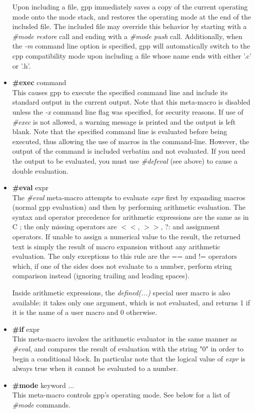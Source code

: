 \begin{itemize}
Upon including a file, gpp immediately saves a copy of the current operating
mode onto the mode stack, and restores the operating mode at the end of the
included file. The included file may override this behavior by starting with
a {\it \#mode restore} call and ending with a {\it \#mode push} call.
Additionally, when the {\it -m} command line option is specified, gpp will
automatically switch to the cpp compatibility mode upon including a file
whose name ends with either '.c' or '.h'.
\item
{\bf \#exec } command\\
This causes gpp to execute the specified command line and include
its standard output in the current output. Note that this meta-macro is
disabled unless the {\it -x} command line flag was specified, for security
reasons. If use of {\it \#exec} is not allowed, a warning message is printed
and the output is left blank. Note that the specified command line is
evaluated before being executed, thus allowing the use of macros in the
command-line. However, the output of the command is included verbatim and 
not evaluated. If you need the output to be evaluated, you must use 
{\it \#defeval} (see above) to cause a double evaluation.
\item
{\bf \#eval } expr\\
The {\it \#eval} meta-macro attempts to evaluate {\it expr} first by expanding
macros (normal gpp evaluation) and then by performing arithmetic evaluation.
The syntax and operator precedence for arithmetic expressions are the same
as in C ; the only missing operators are $<$$<$, $>$$>$, ?: and assignment
operators. If unable to assign a numerical value to the result, the returned
text is simply the result of macro expansion without any arithmetic
evaluation. The only exceptions to this rule are the == and != operators
which, if one of the sides does not evaluate to a number, perform string
comparison instead (ignoring trailing and leading spaces).


Inside arithmetic expressions, the {\it defined(...)} special user macro
is also available: it takes only one argument, which is not evaluated, and
returns 1 if it is the name of a user macro and 0 otherwise.
\item
{\bf \#if } expr\\
This meta-macro invokes the arithmetic evaluator in the same manner as
{\it \#eval}, and compares the result of evaluation with the string "0" in
order to begin a conditional block. In particular note that the logical
value of {\it expr} is always true when it cannot be evaluated to a number.
\item
{\bf \#mode } keyword ...\\
This meta-macro controls gpp's operating mode. See below for a list of
{\it \#mode} commands.
\end{itemize}


